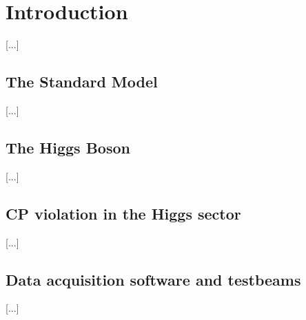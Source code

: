 \chapter{Introduction}
[...]

\section{The Standard Model}
[...]

\section{The Higgs Boson}
[...]

\section{CP violation in the Higgs sector}
[...]

\section{Data acquisition software and testbeams}
[...]